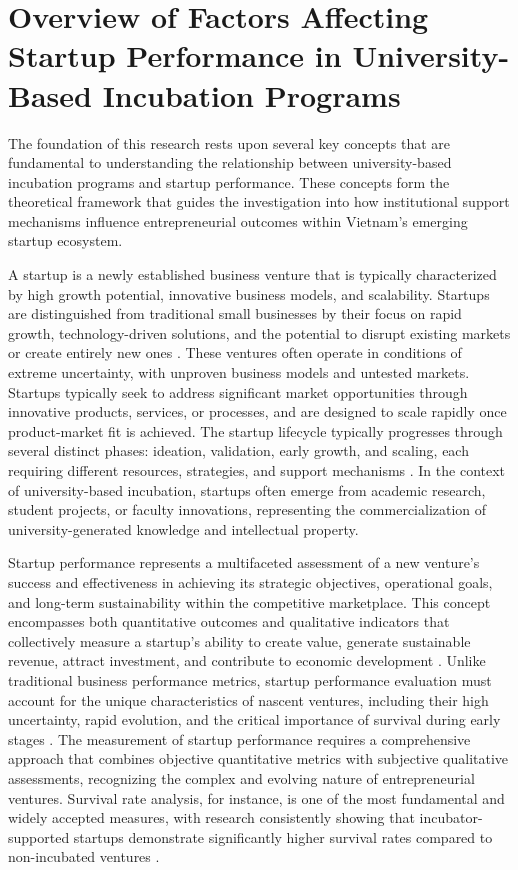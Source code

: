 \documentclass[../Main.tex]{subfiles}
\begin{document}
\section{Overview of Factors Affecting Startup Performance in University-Based Incubation Programs}

The foundation of this research rests upon several key concepts that are fundamental to understanding the relationship between university-based incubation programs and startup performance. These concepts form the theoretical framework that guides the investigation into how institutional support mechanisms influence entrepreneurial outcomes within Vietnam's emerging startup ecosystem.

A startup is a newly established business venture that is typically characterized by high growth potential, innovative business models, and scalability. Startups are distinguished from traditional small businesses by their focus on rapid growth, technology-driven solutions, and the potential to disrupt existing markets or create entirely new ones \autocite{kauffman2013mentoring, sullivan2011effectiveness}. These ventures often operate in conditions of extreme uncertainty, with unproven business models and untested markets. Startups typically seek to address significant market opportunities through innovative products, services, or processes, and are designed to scale rapidly once product-market fit is achieved. The startup lifecycle typically progresses through several distinct phases: ideation, validation, early growth, and scaling, each requiring different resources, strategies, and support mechanisms \autocite{bruneel2010funding}. In the context of university-based incubation, startups often emerge from academic research, student projects, or faculty innovations, representing the commercialization of university-generated knowledge and intellectual property.

Startup performance represents a multifaceted assessment of a new venture's success and effectiveness in achieving its strategic objectives, operational goals, and long-term sustainability within the competitive marketplace. This concept encompasses both quantitative outcomes and qualitative indicators that collectively measure a startup's ability to create value, generate sustainable revenue, attract investment, and contribute to economic development \autocite{patton2014realising, barbero2012revisiting}. Unlike traditional business performance metrics, startup performance evaluation must account for the unique characteristics of nascent ventures, including their high uncertainty, rapid evolution, and the critical importance of survival during early stages \autocite{mian1996assessing}. The measurement of startup performance requires a comprehensive approach that combines objective quantitative metrics with subjective qualitative assessments, recognizing the complex and evolving nature of entrepreneurial ventures. Survival rate analysis, for instance, is one of the most fundamental and widely accepted measures, with research consistently showing that incubator-supported startups demonstrate significantly higher survival rates compared to non-incubated ventures \autocite{NBIA2012}.
\end{document}
